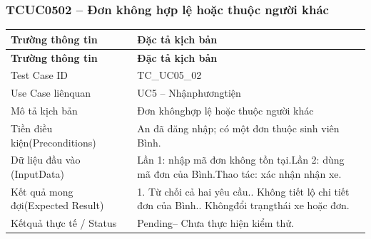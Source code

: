 \subsubsection{TCUC0502 – Đơn không hợp lệ hoặc thuộc người khác}
\begin{longtable}{|L{0.24\textwidth}|L{0.70\textwidth}|}
\hline
\textbf{Trường thông tin} & \textbf{Đặc tả kịch bản} \\
\hline
\endfirsthead
\hline
\textbf{Trường thông tin} & \textbf{Đặc tả kịch bản} \\
\hline
\endhead
Test Case ID & TC\_UC05\_02 \\
\hline
Use Case liênquan & UC5 – Nhậnphươngtiện \\
\hline
Mô tả kịch bản & Đơn khônghợp lệ hoặc thuộc người khác \\
\hline
Tiền điều kiện\newline (Preconditions) & An đã đăng nhập; có một đơn thuộc sinh viên Bình. \\
\hline
Dữ liệu đầu vào (Input\newline Data) & Lần 1: nhập mã đơn không tồn tại.\newline Lần 2: dùng mã đơn của Bình.\newline Thao tác: xác nhận nhận xe. \\
\hline
Kết quả mong đợi\newline (Expected Result) & 1. Từ chối cả hai yêu cầu.. Không tiết lộ chi tiết đơn của Bình.. Khôngđổi trạngthái xe hoặc đơn. \\
\hline
Kếtquả thực tế / Status & Pending– Chưa thực hiện kiểm thử. \\
\hline
\end{longtable}
\vspace{-0.5\baselineskip}
